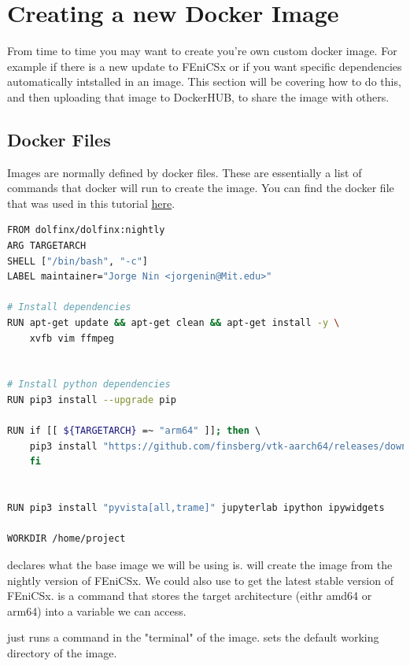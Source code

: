 \documentclass[final]{article}
\numberwithin{equation}{section}
\theoremstyle{remarkStyle}
\begin{document}
\section{Creating a new Docker Image}

From time to time you may want to create you're own custom docker image. For example if there is a new update to FEniCSx or if you want specific dependencies automatically intstalled in an image.
This section will be covering how to do this, and then uploading that image to DockerHUB, to share the image with others.

\subsection{Docker Files}
Images are normally defined by docker files. These are essentially a list of commands that docker will run to create the image.
You can find the docker file that was used in this tutorial \href{https://github.com/jorgenin/2.077-Fenicsx-Plasticity/blob/main/docker/dockerfile}{here}.

\begin{lstlisting}[language=bash]
FROM dolfinx/dolfinx:nightly
ARG TARGETARCH
SHELL ["/bin/bash", "-c"]
LABEL maintainer="Jorge Nin <jorgenin@Mit.edu>"

# Install dependencies
RUN apt-get update && apt-get clean && apt-get install -y \
    xvfb vim ffmpeg


# Install python dependencies
RUN pip3 install --upgrade pip

RUN if [[ ${TARGETARCH} =~ "arm64" ]]; then \ 
    pip3 install "https://github.com/finsberg/vtk-aarch64/releases/download/vtk-9.2.6-cp310/vtk-9.2.6.dev0-cp310-cp310-linux_aarch64.whl";\
    fi


RUN pip3 install "pyvista[all,trame]" jupyterlab ipython ipywidgets

WORKDIR /home/project
\end{lstlisting}
 declares what the base image we will be using is.
 will create the image from the nightly version of FEniCSx. We could also use  to get the latest stable version of FEniCSx.
 is a command that stores the target architecture (eithr amd64 or arm64) into a variable we can access.

\clist{RUN} just runs a command in the "terminal" of the image.
\clist{WORKDIR} sets the default working directory of the image.
\end{document}
